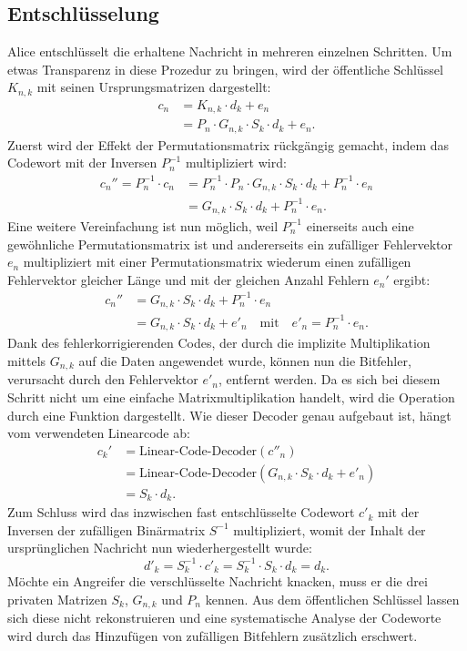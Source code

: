 \subsection{Entschlüsselung
\label{mceliece:section:entschl}}
Alice entschlüsselt die erhaltene Nachricht in mehreren einzelnen Schritten.
Um etwas Transparenz in diese Prozedur zu bringen, wird der öffentliche Schlüssel $K_{n,k}$ mit seinen Ursprungsmatrizen dargestellt:
\begin{align*}
    c_n&=K_{n,k}\cdot d_k + e_n \\
    &= P_{n}\cdot G_{n,k}\cdot S_{k}\cdot d_k + e_n.
\end{align*}
Zuerst wird der Effekt der Permutationsmatrix rückgängig gemacht,
indem das Codewort mit der Inversen $P_n^{-1}$ multipliziert wird:
\begin{align*}
    c_{n}''=P_n^{-1}\cdot c_n&= P_n^{-1}\cdot P_{n}\cdot G_{n,k}\cdot S_{k}\cdot d_k + P_n^{-1}\cdot e_n \\
                                         &= G_{n,k}\cdot S_{k}\cdot d_k + P_n^{-1}\cdot e_n.
\end{align*}
Eine weitere Vereinfachung ist nun möglich,
weil $P_n^{-1}$ einerseits auch eine gewöhnliche Permutationsmatrix ist
und andererseits ein zufälliger Fehlervektor $e_n$ multipliziert mit einer Permutationsmatrix
wiederum einen zufälligen Fehlervektor gleicher Länge und mit der gleichen Anzahl Fehlern $e_n'$ ergibt:
\begin{align*}
    c_{n}''&=G_{n,k}\cdot S_{k}\cdot d_k + P_n^{-1}\cdot e_n \\
             &=G_{n,k}\cdot S_{k}\cdot d_k + e'_n \quad \text{mit} \quad
    e'_n=P_n^{-1}\cdot e_n.
\end{align*}
Dank des fehlerkorrigierenden Codes, der durch die implizite Multiplikation mittels $G_{n,k}$ auf die Daten angewendet wurde,
können nun die Bitfehler, verursacht durch den Fehlervektor $e'_n$,
entfernt werden.
Da es sich bei diesem Schritt nicht um eine einfache Matrixmultiplikation handelt,
wird die Operation durch eine Funktion dargestellt.
Wie dieser Decoder genau aufgebaut ist,
hängt vom verwendeten Linearcode ab:
\begin{align*}
    c_{k}'&=\text{Linear-Code-Decoder}(c''_n)\\
            &=\text{Linear-Code-Decoder}(G_{n,k}\cdot S_{k}\cdot d_k + e'_n)\\
            &=S_{k}\cdot d_k.
\end{align*}
Zum Schluss wird das inzwischen fast entschlüsselte Codewort $c'_k$ mit der Inversen der zufälligen Binärmatrix $S^{-1}$ multipliziert,
womit der Inhalt der ursprünglichen Nachricht nun wiederhergestellt wurde:
\begin{equation*}
    d'_{k}=S_{k}^{-1} \cdot c'_k=S_{k}^{-1} \cdot S_{k}\cdot d_k
                                    =d_k.
\end{equation*}
Möchte ein Angreifer die verschlüsselte Nachricht knacken, muss er die drei privaten Matrizen $S_k$, $G_{n,k}$ und $P_n$ kennen.
Aus dem öffentlichen Schlüssel lassen sich diese nicht rekonstruieren
und eine systematische Analyse der Codeworte wird durch das Hinzufügen von zufälligen Bitfehlern zusätzlich erschwert.

